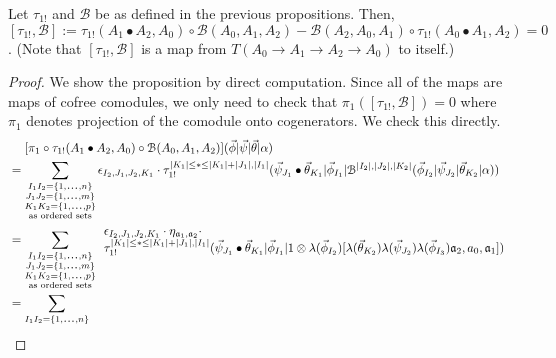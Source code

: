 \begin{prop}
\label{prop:c5}
Let $\tau_{1!}$ and $\mathcal{B}$ be as 
defined in the previous propositions. 
Then, $[\tau_{1!}, \mathcal{B}] := 
\tau_{1!}(A_1\bullet A_2, A_0) \circ 
\mathcal{B}(A_0,A_1,A_2) - 
\mathcal{B}(A_2, A_0, A_1) \circ
\tau_{1!}(A_0 \bullet A_1, A_2) = 0$. 
(Note that $[\tau_{1!}, \mathcal{B}]$ is 
a map from $T(A_0 \to A_1 \to A_2 \to A_0)$ 
to itself.)
\end{prop}
%
\begin{proof}
We show the proposition by direct computation. 
Since all of the maps are maps of cofree 
comodules, we only need to check that 
$\pi_1([\tau_{1!}, \mathcal{B}]) = 0$ where 
$\pi_1$ denotes projection of the comodule 
onto cogenerators. We check this directly.
%
\begin{equation*}
\begin{aligned}
&\phantom{{}={}}
[\pi_1 \circ \tau_{1!}(A_1\bullet A_2, A_0) \circ 
  \mathcal{B}(A_0, A_1, A_2)]
  (\vec{\phi} | \vec{\psi} | \vec{\theta} | \alpha ) \\
&= 
\sum \limits_{\substack{
  I_1I_2 = \{1,\smdots,n\}\\
  J_1J_2 = \{1,\smdots,m\}\\
  K_1K_2 = \{1,\smdots,p\}\\
  \textrm{as ordered sets}}}
\epsilon_{I_2,J_1,J_2,K_1}\cdot
\tau_{1!}^{|K_1| \leq * \leq |K_1|+|J_1|, |I_1|} (
   \vec{\psi}_{J_1} \bullet \vec{\theta}_{K_1} | 
   \vec{\phi}_{I_1} | 
   \mathcal{B}^{|I_2|, |J_2|, |K_2|} (
   \vec{\phi}_{I_2} | \vec{\psi}_{J_2} | \vec{\theta}_{K_2} | \alpha)) \\
&= 
\sum \limits_{\substack{
  I_1I_2 = \{1,\smdots,n\}\\
  J_1J_2 = \{1,\smdots,m\}\\
  K_1K_2 = \{1,\smdots,p\}\\
  \textrm{as ordered sets}}}
\begin{array}{l}  
\epsilon_{I_2,J_1,J_2,K_1}\cdot
\eta_{\mathfrak{a}_1, \mathfrak{a}_2} \cdot\\
\tau_{1!}^{|K_1| \leq * \leq |K_1|+|J_1|, |I_1|} (
   \vec{\psi}_{J_1} \bullet \vec{\theta}_{K_1} | 
   \vec{\phi}_{I_1} |
   1 \otimes \lambda(\vec{\phi}_{I_2})[
     \lambda(\vec{\theta}_{K_2}) \lambda(\vec{\psi}_{J_2}) 
     \lambda(\vec{\phi}_{I_3}) 
     \mathfrak{a}_2, a_0, \mathfrak{a}_1]) 
\end{array} \\
&= 
\sum \limits_{\substack{
  I_1I_2 = \{1,\smdots,n\}\\
}}
\end{aligned}
\end{equation*}
\end{proof}
